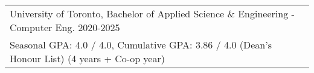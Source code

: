 \begin{tabularx}{\textwidth}{ @{}l r@{} }
University of Toronto, Bachelor of Applied Science \& Engineering - Computer Eng. \hfill{2020-2025}
\\ Seasonal GPA: 4.0 / 4.0, Cumulative GPA: 3.86 / 4.0 (Dean’s Honour List) \hfill{(4 years + Co-op year)}
\end{tabularx}